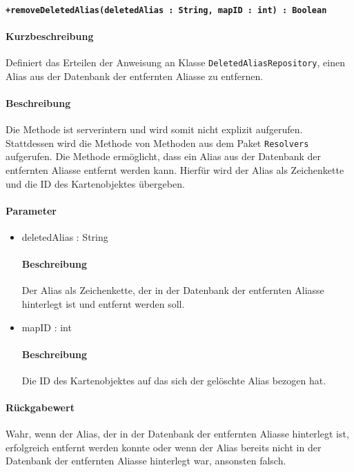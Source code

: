 \paragraph*{\texttt{+removeDeletedAlias(deletedAlias : String, mapID : int) : Boolean}}%
\paragraph*{Kurzbeschreibung}
Definiert das Erteilen der Anweisung an Klasse \texttt{DeletedAliasRepository}, einen Alias aus der Datenbank der entfernten Aliasse zu entfernen.
\paragraph*{Beschreibung}
Die Methode ist serverintern und wird somit nicht explizit aufgerufen.
Stattdessen wird die Methode von Methoden aus dem Paket \texttt{Resolvers} aufgerufen.
Die Methode ermöglicht, dass ein Alias aus der Datenbank der entfernten Aliasse entfernt werden kann.
Hierfür wird der Alias als Zeichenkette und die ID des Kartenobjektes übergeben.
\paragraph*{Parameter}
\begin{itemize}
    \item deletedAlias : String
    		\paragraph*{Beschreibung}
    		Der Alias als Zeichenkette, der in der Datenbank der entfernten Aliasse hinterlegt ist und entfernt werden soll.
	\item mapID : int
			\paragraph*{Beschreibung}
			Die ID des Kartenobjektes auf das sich der gelöschte Alias bezogen hat.		
\end{itemize}
\paragraph*{Rückgabewert}
Wahr, wenn der Alias, der in der Datenbank der entfernten Aliasse hinterlegt ist, erfolgreich entfernt werden konnte oder wenn der Alias bereits nicht in der Datenbank der entfernten Aliasse hinterlegt war, ansonsten falsch.

